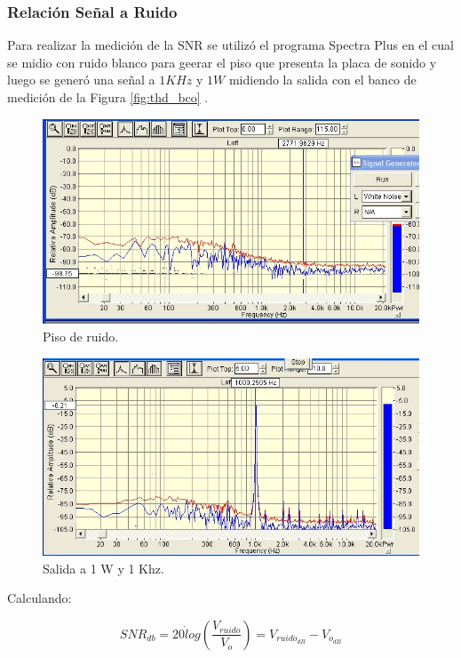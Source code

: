 		\subsubsection{Relación Señal a Ruido}
		Para realizar la medición de la SNR se utilizó el programa Spectra Plus en el cual se midio con ruido blanco para geerar el piso que presenta la placa de sonido y luego se generó una señal a $1KHz$ y $1W$ midiendo la salida con el banco de medición de la Figura \ref{fig:thd_bco} .



			\begin{figure}[H]
				\centering
				\includegraphics[scale=0.6]{./Figuras/ruido_balnco.jpg}
			\caption{Piso de ruido.}
			\end{figure}

			\begin{figure}[H]
				\centering
				\includegraphics[scale=0.6]{./Figuras/SNR_1K_1W_imagen2.jpg}
			\caption{Salida a 1 W y 1 Khz.}
			\end{figure}


			Calculando:

			\begin{equation*}
			SNR_{db}  = 20 \dot log(\frac{V_{ruido}}{V_o}) = V_{ruido_{dB}} - V_{o_{dB}}
			\end{equation*}

